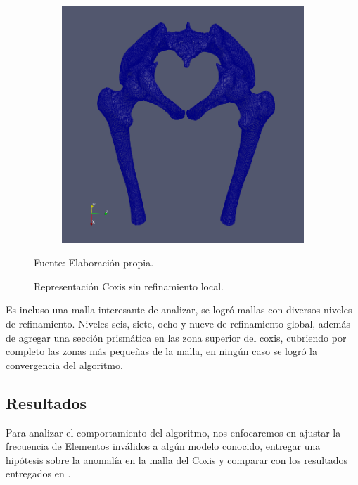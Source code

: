 \begin{figure}[!ht]
    \centering
    \begin{subfigure}[t]{0.8\textwidth}
        \includegraphics[width=1.0\textwidth]{figures/meshes/coxis_8r9_01.png}
    \end{subfigure}
    \caption{ Representación Coxis sin refinamiento local. }
    Fuente: Elaboración propia.
    \label{fig:coxis_8r9_all}
\end{figure}


Es incluso una malla interesante de analizar, se logró mallas con diversos niveles de refinamiento. Niveles seis, siete, ocho y nueve de refinamiento global, además de agregar una sección prismática en las zona superior del coxis, cubriendo por completo las zonas más pequeñas de la malla, en ningún caso se logró la convergencia del algoritmo.





\subsection{Resultados}

Para analizar el comportamiento del algoritmo, nos enfocaremos en ajustar la frecuencia de Elementos inválidos a algún modelo conocido, entregar una hipótesis sobre la anomalía en la malla del Coxis y comparar con los resultados entregados en \cite{daines2018repairing}.

